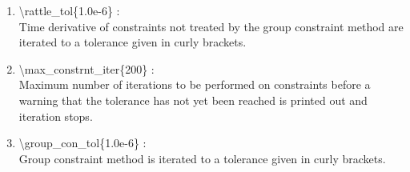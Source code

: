 \documentclass[12pt,titlepage]{article}
\begin{document}
\begin{enumerate}
 \vspace{0.15in} 
 \item   \textbackslash rattle\_tol\{1.0e-6\} : \\
      Time derivative of constraints not treated by the group constraint 
      method are iterated to a tolerance given in curly brackets.


 \vspace{0.15in} 
 \item   \textbackslash max\_constrnt\_iter\{200\} : \\
     Maximum number of iterations to be performed on constraints before a 
     warning that the tolerance has not yet been reached is printed out and 
     iteration stops.

 \vspace{0.15in} 
 \item   \textbackslash group\_con\_tol\{1.0e-6\} : \\
     Group constraint method is iterated to a tolerance given in curly 
     brackets.

%
%
%
%
%

\end{enumerate}
\end{document}
